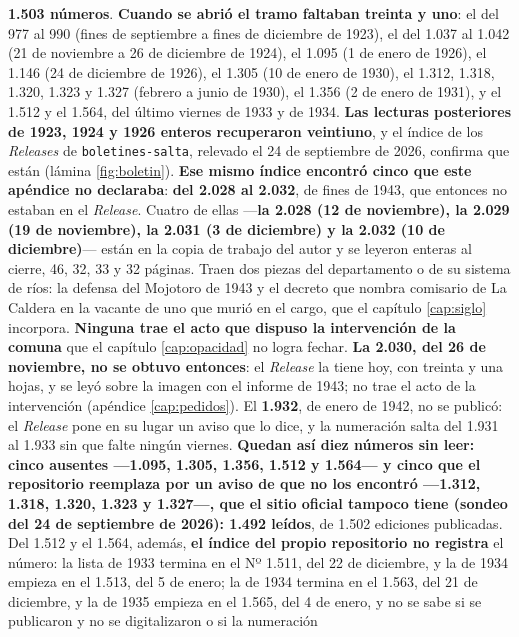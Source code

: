 \textbf{1.503 números}. \textbf{Cuando se abrió el tramo faltaban treinta y uno}: el del 977 al
990 (fines de septiembre a fines de diciembre de 1923), el del 1.037 al 1.042 (21 de noviembre a
26 de diciembre de 1924), el 1.095 (1 de enero de 1926), el 1.146 (24 de diciembre de 1926), el
1.305 (10 de enero de 1930), el 1.312, 1.318, 1.320, 1.323 y 1.327 (febrero a junio de 1930), el
1.356 (2 de enero de 1931), y el 1.512 y el 1.564, del último viernes de 1933 y de 1934. \textbf{Las
lecturas posteriores de 1923, 1924 y 1926 enteros recuperaron veintiuno}, y el índice de los
\textit{Releases} de \texttt{boletines-salta}, relevado el 24 de septiembre de 2026, confirma que
están (lámina \ref{fig:boletin}). \textbf{Ese mismo índice encontró cinco que este apéndice no
declaraba}: \textbf{del 2.028 al 2.032}, de fines de 1943, que entonces no estaban en el \textit{Release}.
Cuatro de ellas ---\textbf{la 2.028 (12 de noviembre), la 2.029 (19 de noviembre), la 2.031 (3 de
diciembre) y la 2.032 (10 de diciembre)}--- están en la copia de trabajo del autor y se leyeron
enteras al cierre, 46, 32, 33 y 32 páginas. Traen dos piezas del departamento o de su sistema de
ríos: la defensa del Mojotoro de 1943 y el decreto que nombra comisario de La Caldera en la
vacante de uno que murió en el cargo, que el capítulo \ref{cap:siglo} incorpora. \textbf{Ninguna
trae el acto que dispuso la intervención de la comuna} que el capítulo \ref{cap:opacidad} no
logra fechar. \textbf{La 2.030, del 26 de noviembre, no se obtuvo entonces}: el \textit{Release} la tiene hoy, con treinta y una hojas, y se leyó sobre la imagen con el informe de 1943; no trae el acto de la intervención (apéndice \ref{cap:pedidos}). El \textbf{1.932}, de enero de 1942, no se publicó: el \textit{Release} pone en su lugar un aviso que lo dice, y la numeración salta del 1.931 al 1.933 sin que falte ningún viernes. \textbf{Quedan así diez números sin leer: cinco ausentes ---1.095,
1.305, 1.356, 1.512 y 1.564--- y cinco que el repositorio reemplaza por un aviso de que no los encontró ---1.312, 1.318, 1.320,
1.323 y 1.327---, que el sitio oficial tampoco tiene (sondeo del 24 de septiembre de 2026): 1.492 leídos}, de 1.502 ediciones publicadas. Del 1.512 y el 1.564, además, \textbf{el índice del propio repositorio no registra} el
número: la lista de 1933 termina en el Nº 1.511, del 22 de diciembre, y la de 1934 empieza en el
1.513, del 5 de enero; la de 1934 termina en el 1.563, del 21 de diciembre, y la de 1935 empieza en
el 1.565, del 4 de enero, y no se sabe si se publicaron y no se digitalizaron o si la numeración
